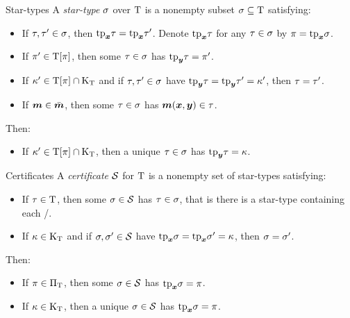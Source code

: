 \documentclass{beamer}
\begin{document}
\begin{frame}{Star-types}
A \emph{star-type} $\sigma$ over $\mathrm{T}$ is a nonempty subset
$\sigma\subseteq\mathrm{T}$ satisfying:
\begin{itemize}
  \item[\condstpx]\label{cond:stpx}
  If $\tau, {\tau'} \in \sigma$, then $\mathrm{tp}_{\bm{x}}\tau = \mathrm{tp}_{\bm{x}}{\tau'}$.
  Denote $\mathrm{tp}_{\bm{x}}\tau$ for any $\tau \in \sigma$ by $\pi=\mathrm{tp}_{\bm{x}}\sigma$.
  
  \item[\condstppy]\label{cond:stppy}
  If ${\pi'} \in \mathrm{T}[\pi]$, then some $\tau\in\sigma$ has
  $\mathrm{tp}_{\bm{y}}\tau = {\pi'}$.
  
  \item[\condstpky]\label{cond:stpky}
  If ${\kappa'} \in \mathrm{T}[\pi]\cap{\mathrm{K}}_{\mathrm{T}}$
  and if $\tau,{\tau'} \in \sigma$ have $\mathrm{tp}_{\bm{y}}\tau = \mathrm{tp}_{\bm{y}}{\tau'} = {\kappa'}$,
  then $\tau = {\tau'}$.
  
  \item[\condstpm]\label{cond:stpm}
  If $\bm{m} \in \bar{\bm{m}}$, then some $\tau\in\sigma$ has $\bm{m}(\bm{x},\bm{y}) \in \tau$.
\end{itemize}
Then:
\begin{itemize}
  \item[\condstpkyu]\label{cond:stpkyu}
  If ${\kappa'} \in \mathrm{T}[\pi]\cap{\mathrm{K}}_{\mathrm{T}}$,
  then a unique $\tau\in\sigma$ has $\mathrm{tp}_{\bm{y}}\tau = \kappa$.
\end{itemize}
\end{frame}

\begin{frame}{Certificates}
A \emph{certificate} $\mathcal{S}$ for $\mathrm{T}$ is a nonempty set of star-types
satisfying:
\begin{itemize}
  \item[\condcertT]\label{cond:certT}
  If $\tau\in\mathrm{T}$, then some $\sigma\in\mathcal{S}$ has $\tau\in\sigma$,
  that is there is a star-type containing each \twotype/.
  \item[\condcertk]\label{cond:certk}
  If $\kappa\in{\mathrm{K}}_{\mathrm{T}}$ and if $\sigma,{\sigma'}\in\mathcal{S}$
  have $\mathrm{tp}_{\bm{x}}\sigma = \mathrm{tp}_{\bm{x}}{\sigma'} = \kappa$, then $\sigma = {\sigma'}$.
\end{itemize}
Then:
\begin{itemize}
  \item[\condcertp]\label{cond:certp}
  If $\pi \in {\Pi}_{\mathrm{T}}$, then some $\sigma\in\mathcal{S}$ has $\mathrm{tp}_{\bm{x}}\sigma = \pi$.
  \item[\condcertku]\label{cond:certku}
  If $\kappa \in {\mathrm{K}}_{\mathrm{T}}$, then a unique $\sigma\in\mathcal{S}$ has $\mathrm{tp}_{\bm{x}}\sigma = \pi$.
\end{itemize}
\end{frame}
\end{document}
